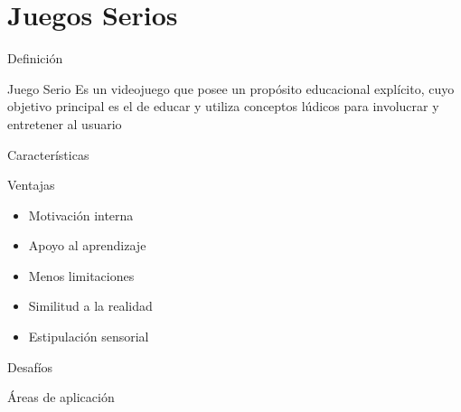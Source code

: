
\section{Juegos Serios}
\setcounter{sectiontotal}{5}

\begin{frame}{Definición}
    \begin{block}{Juego Serio}
    \centering
    Es un videojuego que posee un propósito educacional explícito, cuyo objetivo
    principal es el de educar y utiliza conceptos lúdicos para involucrar y
    entretener al usuario
    \end{block}
\end{frame}
\begin{frame}{Características}
\end{frame}

\begin{frame}{Ventajas}
    \begin{itemize}[<+->]
        \item Motivación interna
        \item Apoyo al aprendizaje
        \item Menos limitaciones
        \item Similitud a la realidad
        \item Estipulación sensorial
    \end{itemize}
\end{frame}
\begin{frame}{Desafíos}
\end{frame}
\begin{frame}{Áreas de aplicación}
\end{frame}

